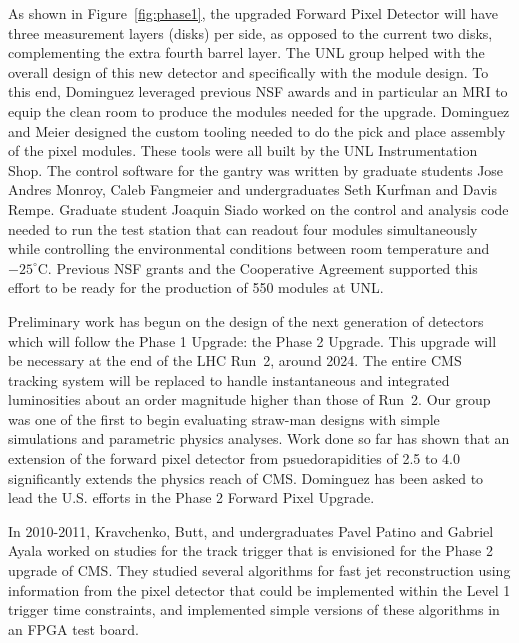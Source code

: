 As shown in Figure~\ref{fig:phase1}, the upgraded Forward Pixel Detector will have three measurement layers (disks) per side, as opposed to the current two disks, complementing the extra fourth barrel layer. The UNL group helped with the overall design of this new detector and specifically with the module design.  To this end, Dominguez leveraged previous NSF awards and in particular an MRI to equip the clean room to produce the modules needed for the upgrade.  Dominguez and Meier  designed the custom tooling needed to do the pick and place assembly of the pixel modules.  These tools were all built by the UNL Instrumentation Shop.  The control software for the gantry was written by graduate students Jose Andres Monroy, Caleb Fangmeier and undergraduates Seth Kurfman and Davis Rempe.  Graduate student Joaquin Siado worked on the control and analysis code needed to run the test station that can readout four modules simultaneously while controlling the environmental conditions between room temperature and $-25^{\circ}$C.  Previous NSF grants and the  Cooperative Agreement supported this effort to be ready for the production of 550 modules at UNL.

Preliminary work has begun on the design of the next generation of detectors which will follow the Phase 1 Upgrade: the Phase 2 Upgrade.  This upgrade will be necessary at the end of the LHC Run~2, around 2024.  The entire CMS tracking system will be replaced to handle instantaneous and integrated luminosities about an order magnitude higher than those of Run~2.  Our group was one of the first to begin evaluating straw-man designs with simple simulations and parametric physics analyses.  Work done so far has shown that an extension of the forward pixel detector from psuedorapidities of 2.5 to 4.0 significantly extends the physics reach of CMS.  Dominguez has been asked to lead the U.S. efforts in the Phase 2 Forward Pixel Upgrade.

In 2010-2011, Kravchenko, Butt, and undergraduates Pavel Patino and Gabriel Ayala  worked on studies for the track trigger that is envisioned for the Phase 2 upgrade of CMS. They studied several algorithms for fast jet reconstruction using information from the pixel detector that could be implemented within the Level 1 trigger time constraints, and implemented simple versions of these algorithms in an FPGA test board.

